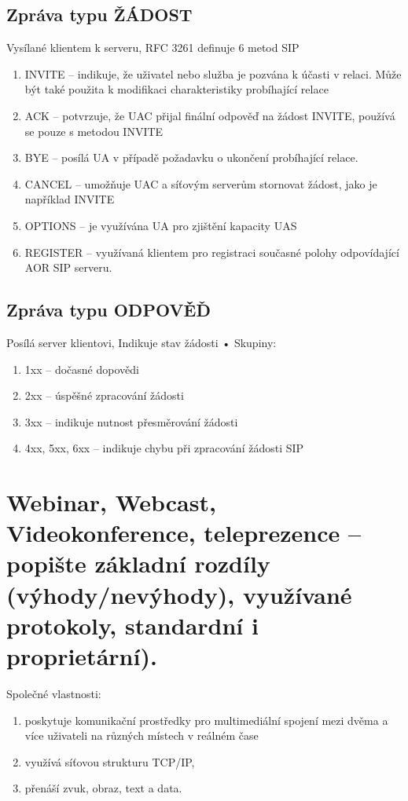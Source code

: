 \subsection{Zpráva typu ŽÁDOST}
Vysílané klientem k serveru, RFC 3261 definuje 6 metod SIP
\begin{enumerate}
    \item INVITE -- indikuje, že uživatel nebo služba je pozvána k účasti v relaci. Může být také použita k modifikaci charakteristiky probíhající relace
    \item ACK -- potvrzuje, že UAC přijal finální odpověď na žádost INVITE, používá se pouze s metodou INVITE
    \item BYE -- posílá UA v případě požadavku o ukončení probíhající relace.
    \item CANCEL -- umožňuje UAC a síťovým serverům stornovat žádost, jako je například INVITE
    \item OPTIONS -- je využívána UA pro zjištění kapacity UAS
    \item REGISTER -- využívaná klientem pro registraci současné polohy odpovídající AOR SIP serveru.
\end{enumerate}

\subsection{Zpráva typu ODPOVĚĎ}
Posílá server klientovi, Indikuje stav žádosti
• Skupiny:
\begin{enumerate}
    \item 1xx – dočasné dopovědi
    \item 2xx – úspěšné zpracování žádosti
    \item 3xx – indikuje nutnost přesměrování žádosti
    \item 4xx, 5xx, 6xx – indikuje chybu při zpracování žádosti SIP
\end{enumerate}


\newpage
\section{Webinar, Webcast, Videokonference, teleprezence – popište základní rozdíly (výhody/nevýhody), využívané protokoly, standardní i proprietární).}

Společné vlastnosti:
\begin{enumerate}
    \item poskytuje komunikační prostředky pro multimediální spojení mezi dvěma a více uživateli na různých místech v reálném čase
    \item využívá síťovou strukturu TCP/IP,
    \item přenáší zvuk, obraz, text a data.
\end{enumerate}

